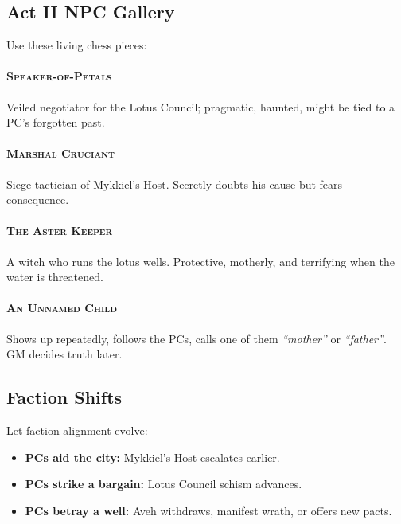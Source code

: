 \documentclass[11pt]{article}
\newcommand{\NPC}[1]{\textsc{#1}}
\begin{document}
\subsection*{Act II NPC Gallery}

Use these living chess pieces:

\paragraph{\NPC{Speaker-of-Petals}}
Veiled negotiator for the Lotus Council; pragmatic, haunted, might be tied to a PC's forgotten past.

\paragraph{\NPC{Marshal Cruciant}}
Siege tactician of Mykkiel's Host. Secretly doubts his cause but fears consequence.

\paragraph{\NPC{The Aster Keeper}}
A witch who runs the lotus wells. Protective, motherly, and terrifying when the water is threatened.

\paragraph{\NPC{An Unnamed Child}}
Shows up repeatedly, follows the PCs, calls one of them \emph{``mother''} or \emph{``father''}.  
GM decides truth later.

\bigskip

\subsection*{Faction Shifts}

Let faction alignment evolve:

\begin{itemize}[leftmargin=*]
  \item \textbf{PCs aid the city:} Mykkiel's Host escalates earlier.
  \item \textbf{PCs strike a bargain:} Lotus Council schism advances.
  \item \textbf{PCs betray a well:} Aveh withdraws, manifest wrath, or offers new pacts.
\end{itemize}
\end{document}
